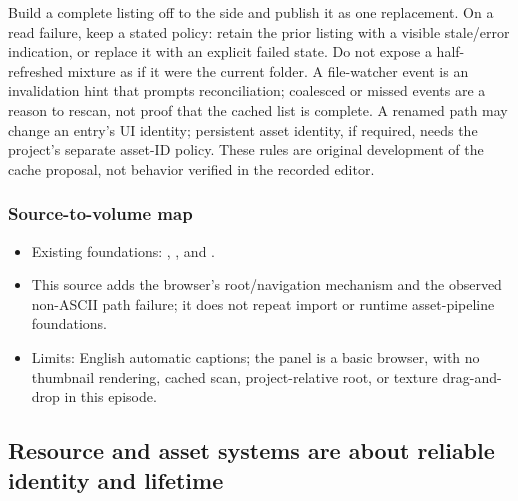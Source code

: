 Build a complete listing off to the side and publish it as one replacement. On a read failure, keep a stated policy: retain the prior listing with a visible stale/error indication, or replace it with an explicit failed state. Do not expose a half-refreshed mixture as if it were the current folder. A file-watcher event is an invalidation hint that prompts reconciliation; coalesced or missed events are a reason to rescan, not proof that the cached list is complete. A renamed path may change an entry's UI identity; persistent asset identity, if required, needs the project's separate asset-ID policy. These rules are original development of the cache proposal, not behavior verified in the recorded editor.

\subsubsection{Source-to-volume map}\label{06-engine-ii-ch027-source-to-volume-map}

\hypertarget{06-engine-ii-ch027-source-to-volume-map}{}

\begin{itemize}
\tightlist
\item
  Existing foundations: , , and .
\item
  This source adds the browser's root/navigation mechanism and the observed non-ASCII path failure; it does not repeat import or runtime asset-pipeline foundations.
\item
  Limits: English automatic captions; the panel is a basic browser, with no thumbnail rendering, cached scan, project-relative root, or texture drag-and-drop in this episode.
\end{itemize}

\subsection{Resource and asset systems are about reliable identity and lifetime}\label{06-engine-ii-ch027-resource-and-asset-systems-are-about-reliable-identity-and-lifetime}

